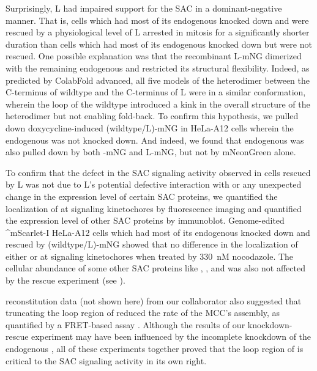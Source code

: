 Surprisingly, \textDelta{}L had impaired support for the SAC in a dominant-negative manner. That is, cells which had most of its endogenous  knocked down and were rescued by a physiological level of \textDelta{}L arrested in mitosis for a significantly shorter duration than cells which had most of its endogenous  knocked down but were not rescued. One possible explanation was that the recombinant \textDelta{}L-mNG dimerized with the remaining endogenous  and restricted its structural flexibility. Indeed, as predicted by ColabFold advanced, all five models of the heterodimer between the C-terminus of wildtype  and the C-terminus of \textDelta{}L were in a similar conformation, wherein the loop of the wildtype  introduced a kink in the overall structure of the heterodimer but not enabling fold-back. To confirm this hypothesis, we pulled down doxycycline-induced (wildtype/\textDelta{}L)-mNG in HeLa-A12 cells wherein the endogenous  was not knocked down. And indeed, we found that endogenous  was also pulled down by both -mNG and \textDelta{}L-mNG, but not by mNeonGreen alone.

To confirm that the defect in the SAC signaling activity observed in cells rescued by \textDelta{}L was not due to \textDelta{}L's potential defective interaction with  or any unexpected change in the expression level of certain SAC proteins, we quantified the localization of  at signaling kinetochores by fluorescence imaging and quantified the expression level of other SAC proteins by immunoblot. Genome-edited ^mScarlet-I HeLa-A12 cells which had most of its endogenous  knocked down and rescued by (wildtype/\textDelta{}L)-mNG showed that no difference in the localization of either  or  at signaling kinetochores when treated by \SI{330}{nM} nocodazole. The cellular abundance of some other SAC proteins like , , and  was also not affected by the rescue experiment (see ).

 reconstitution data (not shown here) from our collaborator also suggested that truncating the loop region of  reduced the rate of the MCC's assembly, as quantified by a FRET-based assay \cite{Faesen2017, BUB1-CDC20-MAD1}. Although the results of our knockdown-rescue experiment may have been influenced by the incomplete knockdown of the endogenous , all of these experiments together proved that the loop region of  is critical to the SAC signaling activity in its own right.